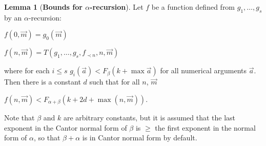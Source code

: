 \documentclass[8pt]{article}
\theoremstyle{definition}
\theoremstyle{definition}
\theoremstyle{definition}
\theoremstyle{definition}
\theoremstyle{definition}
\theoremstyle{definition}
\theoremstyle{definition}
\theoremstyle{definition}
\newtheorem{lemma}{Lemma}[section]
\theoremstyle{definition}
\theoremstyle{definition}
\theoremstyle{definition}
\theoremstyle{definition}
\theoremstyle{definition}
\theoremstyle{question}
\begin{document}
\begin{lemma}[\bf Bounds for $\alpha$-recursion]
  Let $f$ be a function defined from $g_1, \dots, g_s$ by an $\alpha$-recursion:
  \begin{center}
    $f(0, \vec{m}) = g_0(\vec{m})$

    $f(n, \vec{m}) = T(g_1, \dots, g_s, f_{\prec n}, n, \vec{m})$
  \end{center}
  where for each $i \leq s$ $g_i(\vec{a}) < F_{\beta}(k + \max \vec{a})$ for all numerical arguments $\vec{a}$.
  Then there is a constant $d$ such that for all $n$, $\vec{m}$
  \begin{center}
    $f(n, \vec{m}) < F_{\alpha + \beta}(k + 2 d + \max(n, \vec{m}))$.
  \end{center}
\end{lemma}
Note that $\beta$ and $k$ are arbitrary constants, but it is assumed that the last exponent in the Cantor normal
form of $\beta$ is $\geq$ the first exponent in the normal form of $\alpha$, so that $\beta + \alpha$ is in Cantor normal
form by default.
\end{document}
